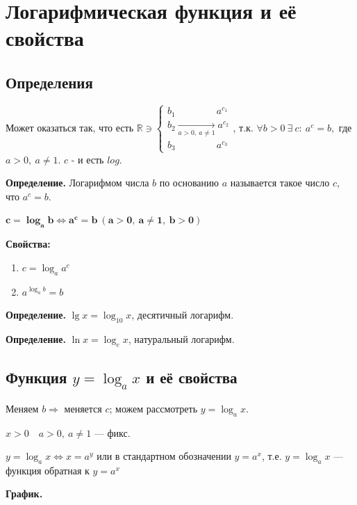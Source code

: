 \documentclass{article}
\begin{document}
    \section{Логарифмическая функция и её свойства}

    \subsection{Определения}

    Может оказаться так, что есть \( \mathbb{R} \ni \begin{cases} b_1\qquad\qquad\  a^{c_1}\\ b_2 \xrightarrow[a > 0,\ a \neq 1]{} a^{c_2}\\ b_3\qquad\qquad\  a^{c_3} \end{cases} \), т.к. \( \forall b > 0\ \exists\ c:\ a^c = b, \) где \( a > 0,\ a \neq 1 \). \( c \) - и есть \(log\).
    
    \textbf{Определение.} Логарифмом числа \(b\) по основанию \(a\) называется такое число \(c\), что \(a^c = b\).

    \(\mathbf{c = \log_a b \Leftrightarrow a^c = b\ (a > 0,\ a \neq 1,\ b > 0)}\)

    \textbf{Свойства:}
    \begin{enumerate}
        \item \(c = \log_a a^c\)
        \item \(a^{\log_a b} = b\)
    \end{enumerate}

    \textbf{Определение.} \(\lg x = \log_{10} x\), десятичный логарифм.
    
    \textbf{Определение.} \(\ln x = \log_e x\), натуральный логарифм.
    
    \subsection{Функция \(y = \log_a x\) и её свойства}
    
    Меняем \( b \Rightarrow \) меняется \(c\); можем рассмотреть \( y = \log_a x \). 

    \(x > 0\quad a > 0,\ a \neq 1\) --- фикс.

    \(y = \log_a x \Leftrightarrow x = a^y \) или в стандартном обозначении \(y = a^x\), т.е. \( y = \log_a x \) --- функция обратная к \( y = a^x \)
    
    \textbf{График.}
\end{document}

